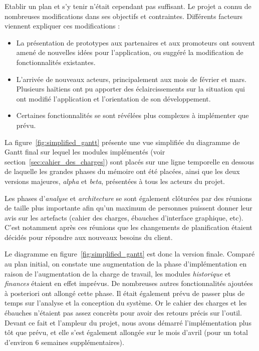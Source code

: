 \documentclass{EPL-master-thesis-covers-FR}
\begin{document}
				Etablir un plan et s'y tenir n'était cependant pas suffisant. Le projet a connu de nombreuses modifications dans ses objectifs et contraintes. Différents facteurs viennent expliquer ces modifications :

				\begin{itemize}
					\item La présentation de prototypes aux partenaires et aux promoteurs ont souvent amené de nouvelles idées pour l'application, ou suggéré la modification de fonctionnalités existantes.
					\item L'arrivée de nouveaux acteurs, principalement aux mois de février et mars. Plusieurs haïtiens ont pu apporter des éclaircissements sur la situation qui ont modifié l'application et l'orientation de son développement.
					\item Certaines fonctionnalités se sont révélées plus complexes à implémenter que prévu.
				\end{itemize}

				La figure~\ref{fig:simplified_gantt} présente une vue simplifiée du diagramme de Gantt final sur lequel les modules implémentés (voir section~\ref{sec:cahier_des_charges}) sont placés sur une ligne temporelle en dessous de laquelle les grandes phases du mémoire ont été placées, ainsi que les deux versions majeures, \emph{alpha} et \emph{beta}, présentées à tous les acteurs du projet.

				Les phases d'\emph{analyse} et \emph{architecture} se sont également clôturées par des réunions de taille plus importante afin qu'un maximum de personnes puissent donner leur avis sur les artefacts (cahier des charges, ébauches d'interface graphique, etc). C'est notamment après ces réunions que les changements de planification étaient décidés pour répondre aux nouveaux besoins du client.

				Le diagramme en figure~\ref{fig:simplified_gantt} est donc la version finale. Comparé au plan initial, on constate une augmentation de la phase d'implémentation en raison de l'augmentation de la charge de travail, les modules \emph{historique} et \emph{finances} étaient en effet imprévus. De nombreuses autres fonctionnalités ajoutées à posteriori ont allongé cette phase.
				Il était également prévu de passer plus de temps sur l'analyse et la conception du système. Or le cahier des charges et les ébauches n'étaient pas assez concrèts pour avoir des retours précis sur l'outil. Devant ce fait et l'ampleur du projet, nous avons démarré l'implémentation plus tôt que prévu, et elle s'est également allongée sur le mois d'avril (pour un total d'environ 6 semaines supplémentaires).
\end{document}
